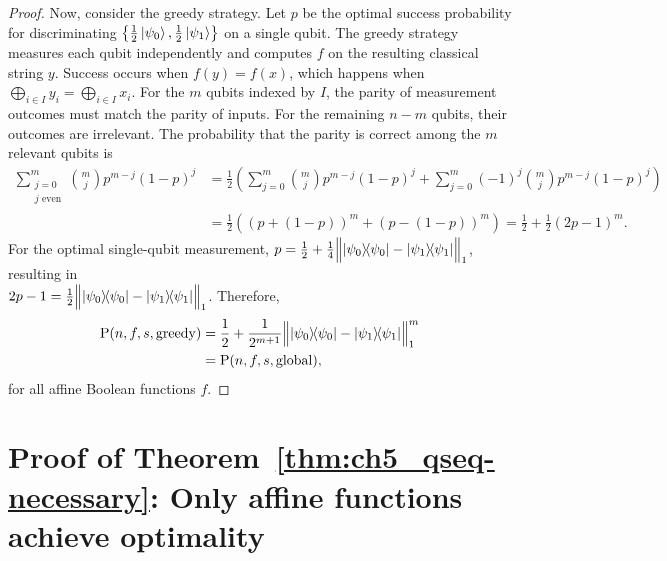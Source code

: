 \begin{proof}
    Now, consider the greedy strategy.
    Let $p$ be the optimal success probability for discriminating $\left\{ \frac{1}{2}\ket{\psi_0}, \frac{1}{2}\ket{\psi_1} \right\}$ on a single qubit.
    The greedy strategy measures each qubit independently and computes $f$ on the resulting classical string $y$.
    Success occurs when $f(y) = f(x)$, which happens when $\bigoplus_{i \in I} y_i = \bigoplus_{i \in I} x_i$.
    For the $m$ qubits indexed by $I$, the parity of measurement outcomes must match the parity of inputs.
    For the remaining $n-m$ qubits, their outcomes are irrelevant.
    The probability that the parity is correct among the $m$ relevant qubits is
    \begin{equation}
    \begin{aligned}
        \sum_{\substack{j=0 \\ j \text{ even}}}^m \binom{m}{j} p^{m-j}(1-p)^j
        &= \frac{1}{2} \left( \sum_{j=0}^m \binom{m}{j} p^{m-j}(1-p)^j + \sum_{j=0}^m (-1)^j \binom{m}{j} p^{m-j}(1-p)^j \right) \\[-.75em]
        &= \frac{1}{2} \left( (p + (1-p))^m + (p - (1-p))^m \right)
        = \frac{1}{2} + \frac{1}{2}(2p - 1)^m.
    \end{aligned}
    \end{equation}
    For the optimal single-qubit measurement, $p = \frac{1}{2} + \frac{1}{4} \norm[\Big]{ \ketbra{\psi_0} - \ketbra{\psi_1} }_1$, resulting in \\ $2p - 1 = \frac{1}{2} \norm[\Big]{ \ketbra{\psi_0} - \ketbra{\psi_1} }_1$.
    Therefore,
    \begin{equation}
    \begin{aligned}
        \P(n,f,s,\greedy) &= \frac{1}{2} + \frac{1}{2^{m+1}} \norm[\Big]{ \ketbra{\psi_0} - \ketbra{\psi_1} }_1^m \\
        &= \P(n,f,s,\glo),
    \end{aligned}
    \end{equation}
    for all affine Boolean functions $f$.
\end{proof}

\section{Proof of Theorem~\ref{thm:ch5_qseq-necessary}: Only affine functions achieve optimality}\label{sec:ch5_qseq-necessary}

